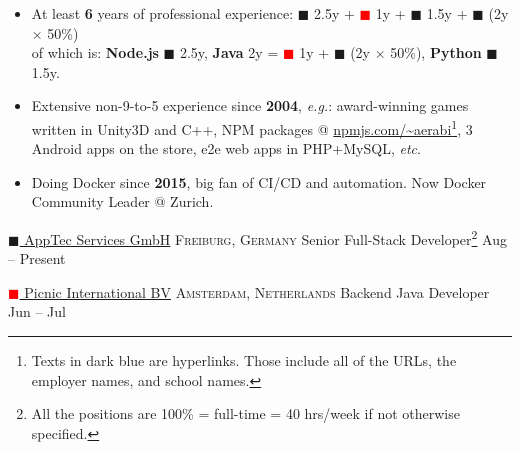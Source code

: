 \documentclass[10pt,a4paper]{article}
\newcommand{\colorsquare}[1]{\textcolor{#1}{$\blacksquare$}}
\begin{document}
\begin{itemize}
    \item At least \textbf{6} years of professional experience:
      \colorsquare{frenchblue} 2.5y +
      \colorsquare{red} 1y +
      \colorsquare{bazaar} 1.5y +
      \colorsquare{camouflagegreen} (2y $\times$ 50\%) \\
        of which is:
        \textbf{Node.js} \colorsquare{frenchblue} 2.5y,
        \textbf{Java} 2y = \colorsquare{red} 1y + \colorsquare{camouflagegreen} (2y $\times$ 50\%),
        \textbf{Python} \colorsquare{bazaar} 1.5y.
    
    \item Extensive non-9-to-5 experience since \textbf{2004}, \textit{e.g.}:
    award-winning games written in Unity3D and C++,
    NPM packages @ \href{https://www.npmjs.com/~aerabi}{\url{npmjs.com/~aerabi}}\footnote{Texts in dark blue are hyperlinks. Those include all of the URLs, the employer names, and school names.}, 3 Android apps on the store, e2e web apps in PHP+MySQL, \textit{etc}.
    
    \item Doing Docker since \textbf{2015}, big fan of CI/CD and automation. Now Docker Community Leader @ Zurich.
\end{itemize}

\spacedhrule{-0.2em}{-0.4em}


\headedsection
  {\href{https://www.apptec360.com/}{\colorsquare{frenchblue} AppTec Services GmbH}}
  {\textsc{Freiburg, Germany}} {%
  \headedsubsection
    {Senior Full-Stack Developer\footnote{All the positions are 100\% = full-time = 40 hrs/week if not otherwise specified.}}
    {Aug  -- Present}
    {}
}

\headedsection
  {\href{https://picnic.app/}{\colorsquare{red} Picnic International BV}}
  {\textsc{Amsterdam, Netherlands}} {%
  \headedsubsection
    {Backend Java Developer}
    {Jun  -- Jul }
    {}
}
\end{document}
